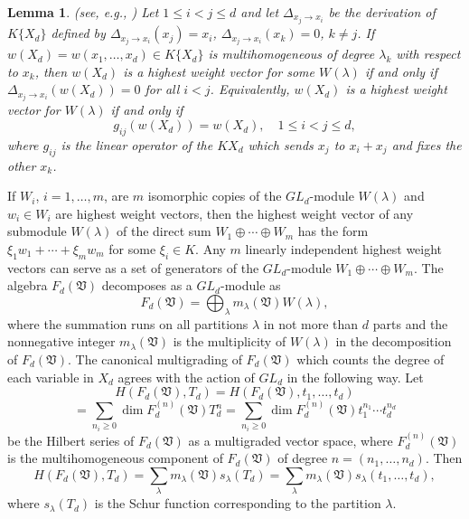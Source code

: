 \documentclass{amsart}[12pt]
\newtheorem{lemma}[theorem]{Lemma}
\theoremstyle{definition}
\begin{document}
\begin{lemma}\label{criterion for hwv} {\rm (see, e.g., \cite{BD})}
Let $1\leq i<j\leq d$ and let
$\Delta_{x_j\to x_i}$ be the derivation of $K\{X_d\}$
defined by $\Delta_{x_j\to x_i}(x_j)=x_i$, $\Delta_{x_j\to x_i}(x_k)=0$, $k\not=j$.
If $w(X_d)=w(x_1,\ldots,x_d) \in K\{X_d\}$
is multihomogeneous of degree $\lambda_k$ with respect to $x_k$,
then $w(X_d)$ is a highest weight vector for some
$W(\lambda)$ if and only if $\Delta_{x_j\to x_i}(w(X_d))=0$
for all $i<j$. Equivalently, $w(X_d)$ is a highest weight vector
for $W(\lambda)$ if and only if
\[
g_{ij}(w(X_d))=w(X_d),\quad 1\leq i<j\leq d,
\]
where $g_{ij}$ is the linear operator of the $KX_d$ which
sends $x_j$ to $x_i+x_j$ and fixes the other $x_k$.
\end{lemma}

If $W_i$, $i=1,\ldots,m$,
are $m$ isomorphic copies of the $GL_d$-module $W(\lambda)$
and $w_i\in W_i$ are highest weight
vectors, then the highest weight vector of any submodule $W(\lambda)$
of the direct sum $W_1\oplus\cdots\oplus W_m$ has the form
$\xi_1w_1+\cdots+\xi_mw_m$ for some $\xi_i\in K$.
Any $m$ linearly independent highest weight vectors can serve
as a set of generators of the $GL_d$-module $W_1\oplus\cdots\oplus W_m$.
The algebra $F_d({\mathfrak V})$ decomposes as a $GL_d$-module as
\begin{equation}\label{GL-decomposition of free algebras}
F_d({\mathfrak V})=\bigoplus_{\lambda}m_{\lambda}({\mathfrak V})W(\lambda),
\end{equation}
where the summation runs on all partitions $\lambda$ in not more than $d$ parts and the nonnegative integer $m_{\lambda}({\mathfrak V})$
is the multiplicity of $W(\lambda)$ in the decomposition of $F_d({\mathfrak V})$.
The canonical multigrading of $F_d({\mathfrak V})$ which counts the degree of each variable in $X_d$
agrees with the action of $GL_d$ in the following way. Let
\[
H(F_d({\mathfrak V}),T_d)=H(F_d({\mathfrak V}),t_1,\ldots,t_d)
\]
\[
=\sum_{n_i\geq 0}\dim F_d^{(n)}({\mathfrak V})T_d^n
=\sum_{n_i\geq 0}\dim F_d^{(n)}({\mathfrak V})t_1^{n_1}\cdots t_d^{n_d}
\]
be the Hilbert series of $F_d({\mathfrak V})$ as a multigraded vector space, where $F_d^{(n)}({\mathfrak V})$ is the multihomogeneous
component of $F_d({\mathfrak V})$ of degree $n=(n_1,\ldots,n_d)$.
Then
\[
H(F_d({\mathfrak V}),T_d)=\sum_{\lambda}m_{\lambda}({\mathfrak V})s_{\lambda}(T_d)=\sum_{\lambda}m_{\lambda}({\mathfrak V})s_{\lambda}(t_1,\ldots,t_d),
\]
where $s_{\lambda}(T_d)$ is the Schur function corresponding to the partition $\lambda$.
\end{document}
